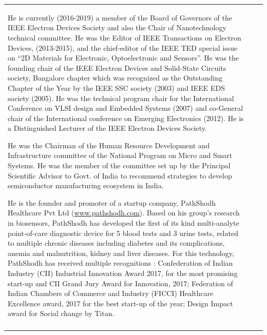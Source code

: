 {\begin{longtable}{V{2.5}p{.95\textwidth}V{2.5}}
\bigskip

He is currently (2016-2019) a member of the Board of Governors of the IEEE Electron Devices Society and also the Chair of Nanotechnology technical committee. He was the Editor of IEEE Transactions on Electron Devices, (2013-2015),  and the chief-editor of the IEEE TED special issue on “2D Materials for Electronic, Optoelectronic and Sensors”. He was the founding chair of the IEEE Electron Devices and Solid-State Circuits society, Bangalore chapter which was recognized as the Outstanding Chapter of the Year by the IEEE SSC society (2003) and IEEE EDS society (2005). He was the technical program chair for the International Conference on VLSI design and Embedded Systems (2007) and co-General chair of the International conference on Emerging Electronics (2012). He is a Distinguished Lecturer of the IEEE Electron Devices Society. 

\bigskip

He was the Chairman of the Human Resource Development and Infrastructure committee of the National Program on Micro and Smart Systems. He was the member of the committee set up by the Principal Scientific Advisor to Govt. of India to recommend strategies to develop semiconductor manufacturing ecosystem in India.  

\bigskip

He is the founder and promoter of a startup company, PathShodh Healthcare Pvt Ltd (\url{www.pathshodh.com}).   Based on his group’s research in biosensors, PathShodh has developed the first of its kind multi-analyte point-of-care diagnostic device for 5 blood tests and 3 urine tests, related to multiple chronic diseases including diabetes and its complications, anemia and malnutrition, kidney and liver diseases. For this technology, PathShodh has received multiple recognitions : Confederation of Indian Industry (CII) Industrial Innovation Award 2017, for the most promising start-up and CII Grand Jury Award for Innovation, 2017; Federation of Indian Chambers of Commerce and Industry (FICCI) Healthcare Excellence award, 2017 for the best start-up of the year; Design Impact award for Social change by Titan. \\
\end{longtable}}\relax
